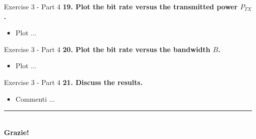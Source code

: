 \documentclass[10pt, aspectratio=169]{beamer}
\newcommand{\question}[1]{{\color{QuestionRed}\textbf{#1}}}
\begin{document}
	\begin{frame}{Exercise 3 - Part 4}
		\question{19. Plot the bit rate versus the transmitted power $P_{TX}$.}
		
		\vspace{0.1cm}
		\begin{itemize}
			\item Plot ... 
		\end{itemize}
		
	\end{frame}
	
	\begin{frame}{Exercise 3 - Part 4}
		\question{20. Plot the bit rate versus the bandwidth $B$.}
		
		\vspace{0.1cm}
		\begin{itemize}
			\item Plot ... 
		\end{itemize}
		
	\end{frame}
	
	\begin{frame}{Exercise 3 - Part 4}
		\question{21. Discuss the results.}
		
		\vspace{0.1cm}
		\begin{itemize}
			\item Commenti ... 
		\end{itemize}
		
	\end{frame}
	
	
	\begin{frame}[plain]
		\vfill
		\centering
		{\color{TealAccent}\rule{2.5cm}{2pt}}\\[0.5cm]
		{\Huge\bfseries\color{NavyPrimary} Grazie!}\\[0.3cm]
		\vfill
	\end{frame}
	
\end{document}
